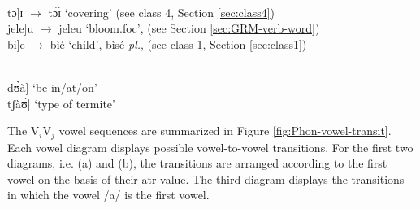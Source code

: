 \begin{exe}
\ex\label{ex:V1V2vowel-seq}
\begin{xlist}

\ex   {\rm  V$_{i}$]-V$_{j}$ : a morpheme boundary intervenes}\\
tɔ]ɪ   $\rightarrow$ tɔ́ɪ́   {\rm `covering'} {\rm (see {\sc class 4},  
Section \ref{sec:class4})}\\
jele]u $\rightarrow$  jeleu  {\rm `bloom.{\sc foc}}', 
(see Section  \ref{sec:GRM-verb-word}) \\  
bi]e	 $\rightarrow$ bìé     {\rm `child'},   bìsé  {\it pl.},     
 {\rm  (see {\sc class 1},  
Section \ref{sec:class1})}	

\\
 dʊ̀à]    {\rm `be in/at/on'}\\
tʃàʊ́]    {\rm  `type of termite'}

\end{xlist}
\end{exe}

The V$_{i}$V$_{j}$ vowel sequences are  summarized in Figure 
\ref{fig:Phon-vowel-transit}.  Each vowel diagram displays possible 
vowel-to-vowel transitions. For the first two diagrams, i.e. (a) and (b), the 
transitions are arranged according to the first vowel on the basis of their {\sc 
atr} value. The third diagram displays the transitions in which the vowel {\sls 
/a/}  is the first vowel. 

